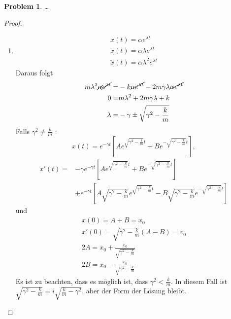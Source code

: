 \documentclass[prb,12pt]{revtex4-2}
\theoremstyle{definition}
\newtheorem{Problem}{Problem}
\theoremstyle{definition}
\begin{document}
\begin{Problem}
	\ldots	
\end{Problem}

\begin{proof}
	\begin{enumerate}
	\item 	
	\begin{gather*}
		x(t)=\alpha e^{\lambda t}\\
		\dot{x}(t)=\alpha\lambda e^{\lambda t}\\
		\ddot{x}(t)=\alpha\lambda^2e^{\lambda t}
	\end{gather*}
Daraus folgt
\begin{align*}
	m\lambda^2\cancel\alpha\cancel{e^{\lambda t}}=&-k\cancel{\alpha e^{\lambda t}}-2m\gamma\lambda\cancel{\alpha e^{\lambda t}}\\
	0=&m\lambda^2+2m\gamma\lambda+k\\
	\lambda=&-\gamma\pm \sqrt{\gamma^2-\frac{k}{m}}
\end{align*}
Falls $\gamma^2 \neq \frac{k}{m}$ :
\[
	x(t)=e^{-\gamma t}\left[ Ae^{\sqrt{\gamma^2-\frac{k}{m}} t}+Be^{-\sqrt{\gamma^2-\frac{k}{m}} t} \right] 
,\] 
\begin{align*}
	x'(t)=&-\gamma e^{-\gamma t}\left[ Ae^{\sqrt{\gamma^2-\frac{k}{m}} t}+Be^{-\sqrt{\gamma^2-\frac{k}{m}} t} \right] \\
	      &+e^{-\gamma t}\left[ A\sqrt{\gamma^2-\frac{k}{m}} e^{\sqrt{\gamma^2-\frac{k}{m}} t}-B\sqrt{\gamma^2-\frac{k}{m}} e^{-\sqrt{\gamma^2-\frac{k}{m}} t} \right] 
\end{align*}
und
\begin{gather*}
	x(0)=A+B=x_0\\
	x'(0)=\sqrt{\gamma^2-\frac{k}{m}} \left( A-B \right)=v_0\\
	2A=x_0+\frac{v_0}{\sqrt{\gamma^2-\frac{k}{m}} }\\
	2B=x_0-\frac{v_0}{\sqrt{\gamma^2-\frac{k}{m}} }
\end{gather*}
Es ist zu beachten, dass es möglich ist, dass $\gamma^2<\frac{k}{m}$. In diesem Fall ist $\sqrt{\gamma^2-\frac{k}{m}} =i\sqrt{\frac{k}{m}-\gamma^2} $, aber der Form der L\"{o}sung bleibt.


\end{enumerate}
\end{proof}
\end{document}
